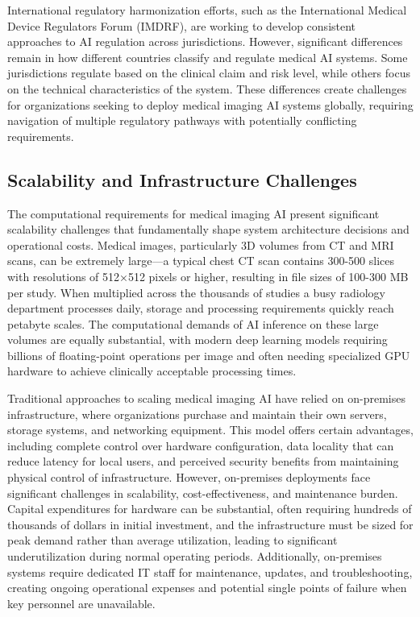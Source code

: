 \documentclass[12pt,a4paper]{article}
\begin{document}
International regulatory harmonization efforts, such as the International Medical Device Regulators Forum (IMDRF), are working to develop consistent approaches to AI regulation across jurisdictions. However, significant differences remain in how different countries classify and regulate medical AI systems. Some jurisdictions regulate based on the clinical claim and risk level, while others focus on the technical characteristics of the system. These differences create challenges for organizations seeking to deploy medical imaging AI systems globally, requiring navigation of multiple regulatory pathways with potentially conflicting requirements.

\subsection{Scalability and Infrastructure Challenges}

The computational requirements for medical imaging AI present significant scalability challenges that fundamentally shape system architecture decisions and operational costs. Medical images, particularly 3D volumes from CT and MRI scans, can be extremely large—a typical chest CT scan contains 300-500 slices with resolutions of 512×512 pixels or higher, resulting in file sizes of 100-300 MB per study. When multiplied across the thousands of studies a busy radiology department processes daily, storage and processing requirements quickly reach petabyte scales. The computational demands of AI inference on these large volumes are equally substantial, with modern deep learning models requiring billions of floating-point operations per image and often needing specialized GPU hardware to achieve clinically acceptable processing times.

Traditional approaches to scaling medical imaging AI have relied on on-premises infrastructure, where organizations purchase and maintain their own servers, storage systems, and networking equipment. This model offers certain advantages, including complete control over hardware configuration, data locality that can reduce latency for local users, and perceived security benefits from maintaining physical control of infrastructure. However, on-premises deployments face significant challenges in scalability, cost-effectiveness, and maintenance burden. Capital expenditures for hardware can be substantial, often requiring hundreds of thousands of dollars in initial investment, and the infrastructure must be sized for peak demand rather than average utilization, leading to significant underutilization during normal operating periods. Additionally, on-premises systems require dedicated IT staff for maintenance, updates, and troubleshooting, creating ongoing operational expenses and potential single points of failure when key personnel are unavailable.
\end{document}
